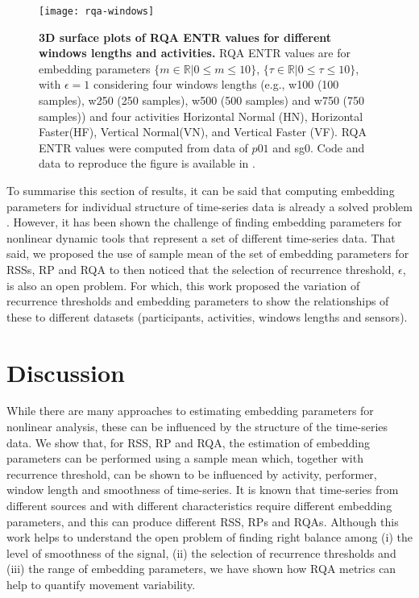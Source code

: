 \documentclass[fleqn,10pt]{wlscirep}
\begin{document}
\begin{figure}[ht]
\centering
\texttt{[image: rqa-windows]}
    \caption{
	{\bf 3D surface plots of RQA ENTR values for different windows lengths and activities.}
	RQA ENTR values are for embedding parameters
	$ \{ m \in \mathbb{R} | 0 \le m \le 10  \}$,
	$ \{ \tau \in \mathbb{R} | 0 \le \tau \le 10  \}$, 
	with $\epsilon = 1 $ considering four 
	windows lengths (e.g., w100 (100 samples), w250 (250 samples),
	w500 (500 samples) and w750 (750 samples)) and
	four activities 
	Horizontal Normal (HN), Horizontal Faster(HF), Vertical Normal(VN), and 
	Vertical Faster (VF).
	RQA ENTR values were computed from data of $p01$ and sg0.
	Code and data to reproduce the figure is available in \cite{srep2020}.
       }
\label{fig:3dRQAENTR_windowsactivities}
\end{figure}

To summarise this section of results, it can be said that computing
embedding parameters for individual structure of time-series 
data is already a solved problem \cite{frank2010, sama2013, bradley2015}. 
However, it has been shown the challenge of finding embedding parameters
for nonlinear dynamic tools that represent a set of different time-series data.
That said, we proposed the use of sample mean of the set of embedding parameters
for RSSs, RP and RQA to then noticed that the selection of recurrence 
threshold, $\epsilon$, is also an open problem.
For which, this work proposed the variation of recurrence thresholds 
and embedding parameters to show the relationships of these to different datasets 
(participants, activities, windows lengths and sensors).

\section*{Discussion}
While there are many approaches to estimating embedding parameters for nonlinear analysis, 
these can be influenced by the structure of the time-series data.   
We show that, for RSS, RP and RQA, the estimation of embedding parameters can be performed 
using a sample mean which, together with recurrence threshold, can be shown to be 
influenced by activity, performer, window length and smoothness of time-series.  
It is known that time-series from different sources and with different characteristics 
require different embedding parameters, and this can produce different RSS, RPs and RQAs. 
Although this work helps to understand the open problem of 
finding right balance among (i) the level of smoothness of the signal, 
(ii) the selection of recurrence thresholds and (iii) 
the range of embedding parameters, 
we have shown how RQA metrics can help to quantify movement variability.
\end{document}
